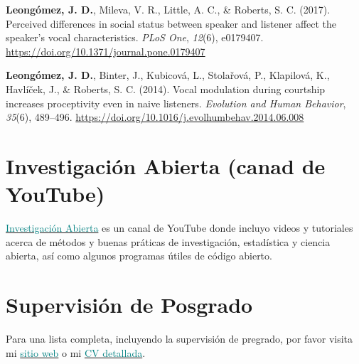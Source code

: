 \documentclass[11pt, a4paper]{awesome-cv}
\begin{document}
\leavevmode\hypertarget{ref-Leongomez2017}{}%
\textbf{Leongómez, J. D.}, Mileva, V. R., Little, A. C., \& Roberts, S.
C. (2017). {Perceived differences in social status between speaker and
listener affect the speaker's vocal characteristics}. \emph{PLoS One},
\emph{12}(6), e0179407.
\url{https://doi.org/10.1371/journal.pone.0179407}

\leavevmode\hypertarget{ref-Leongomez2014}{}%
\textbf{Leongómez, J. D.}, Binter, J., Kubicová, L., Stolařová, P.,
Klapilová, K., Havlíček, J., \& Roberts, S. C. (2014). {Vocal modulation
during courtship increases proceptivity even in naive listeners}.
\emph{Evolution and Human Behavior}, \emph{35}(6), 489--496.
\url{https://doi.org/10.1016/j.evolhumbehav.2014.06.008}

\endgroup

\hypertarget{investigaciuxf3n-abierta-canad-de-youtube}{%
\section{Investigación Abierta (canad de
YouTube)}\label{investigaciuxf3n-abierta-canad-de-youtube}}

\href{https://www.youtube.com/user/juanleongomez/featured}{\textcolor{teal}{Investigación Abierta}}
es un canal de YouTube donde incluyo videos y tutoriales acerca de
métodos y buenas práticas de investigación, estadística y ciencia
abierta, así como algunos programas útiles de código abierto.

\hypertarget{supervisiuxf3n-de-posgrado}{%
\section{Supervisión de Posgrado}\label{supervisiuxf3n-de-posgrado}}

Para una lista completa, incluyendo la supervisión de pregrado, por
favor visita mi
\href{https://jdleongomez.info/es/team/\#students}{\textcolor{teal}{sitio web}}
o mi
\href{https://jdleongomez.info/es/files/jdl_cv_es.pdf}{\textcolor{teal}{CV detallada}}.
\end{document}

